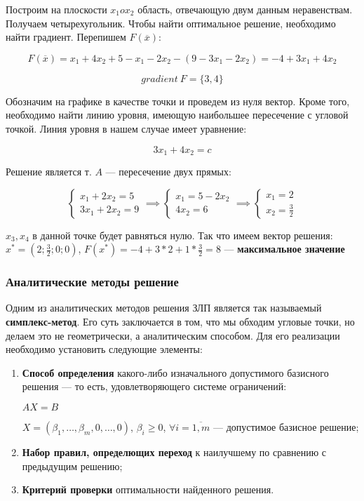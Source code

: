 \documentclass{article}
\begin{document}
Построим на плоскости $x_1 o x_2$ область, отвечающую двум данным неравенствам. Получаем четырехугольник. Чтобы найти оптимальное решение, необходимо найти градиент. Перепишем $F(\overline{x})$:

$$F(\overline{x}) = x_1 + 4x_2 + 5 - x_1 - 2x_2 - (9 - 3x_1 - 2x_2) = -4 + 3x_1 + 4x_2$$

$$gradient \ F = \{ 3, 4 \}$$

Обозначим на графике в качестве точки и проведем из нуля вектор. Кроме того, необходимо найти линию уровня, имеющую наибольшее пересечение с угловой точкой. Линия уровня в нашем случае имеет уравнение:

$$3x_1 + 4x_2 = c$$

Решение является т. $A$ — пересечение двух прямых:

$$
\begin{cases}
    x_1 + 2x_2 = 5 \\
    3x_1 + 2x_2 = 9
\end{cases} \implies \begin{cases}
    x_1 = 5 - 2x_2 \\
    4x_2 = 6
\end{cases} \implies \begin{cases}
    x_1 = 2 \\ 
    x_2 = \frac{3}{2}
\end{cases}
$$

$x_3, x_4$ в данной точке будет равняться нулю. Так что имеем вектор решения: $x^{*} = (2; \frac{3}{2}; 0; 0)$, $F(x^{*}) = -4 + 3 * 2 + 1 * \frac{3}{2} = 8$ — \textbf{максимальное значение}

\subsubsection{Аналитические методы решение}

Одним из аналитических методов решения ЗЛП является так называемый \textbf{симплекс-метод}. Его суть заключается в том, что мы обходим угловые точки, но делаем это не геометрически, а аналитическим способом. Для его реализации необходимо установить следующие элементы:

\begin{enumerate}
    \item \textbf{Способ определения} какого-либо изначального допустимого базисного решения — то есть, удовлетворяющего системе ограничений:
    
    $AX = B$

    $X = (\beta_1, \dots, \beta_m, 0, \dots, 0)$, $\beta_{i} \ge 0$, $\forall i = \overline{1, m}$ — допустимое базисное решение;
    \item \textbf{Набор правил, определющих переход} к наилучшему по сравнению с предыдущим решению;
    \item \textbf{Критерий проверки} оптимальности найденного решения.
\end{enumerate}
\end{document}
